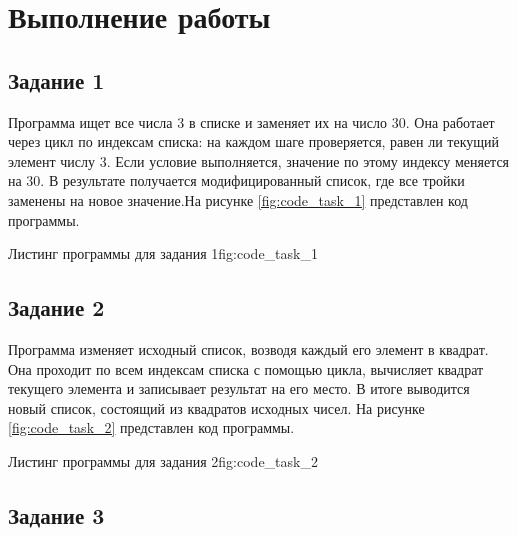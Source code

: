 \documentclass[]{vvsu}
\begin{document}
\toc

\section{Выполнение работы}

\subsection{Задание 1}

Программа ищет все числа 3 в списке и заменяет их на число 30. Она работает через цикл по индексам списка: на каждом шаге проверяется, равен ли текущий элемент числу 3. Если условие выполняется, значение по этому индексу меняется на 30. В результате получается модифицированный список, где все тройки заменены на новое значение.На рисунке \ref{fig:code_task_1} представлен код программы.

\begin{vvsu_figure}{Листинг программы для задания 1}{fig:code_task_1}
  \begin{minipage}{.75\textwidth}
    
  \end{minipage}
\end{vvsu_figure}

\subsection{Задание 2}
Программа изменяет исходный список, возводя каждый его элемент в квадрат. Она проходит по всем индексам списка с помощью цикла, вычисляет квадрат текущего элемента и записывает результат на его место. В итоге выводится новый список, состоящий из квадратов исходных чисел. На рисунке \ref{fig:code_task_2} представлен код программы.

\begin{vvsu_figure}{Листинг программы для задания 2}{fig:code_task_2}
  \begin{minipage}{.75\textwidth}
    
  \end{minipage}
\end{vvsu_figure}

\subsection{Задание 3}
\end{document}
